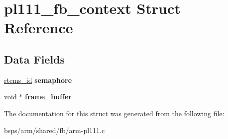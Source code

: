 \hypertarget{structpl111__fb__context}{}\section{pl111\+\_\+fb\+\_\+context Struct Reference}
\label{structpl111__fb__context}
\subsection*{Data Fields}
\begin{DoxyCompactItemize}
\item 
\mbox{\label{structpl111__fb__context_a902c6d780ec77386ff126073ecb726b5}} 
\mbox{\hyperlink{group__ClassicTasks_gab20892b814dced7dd4e5b9bf42becd57}{rtems\+\_\+id}} {\bfseries semaphore}
\item 
\mbox{\label{structpl111__fb__context_a7434e84606e0c2dfe4a14f75d0c0cdef}} 
void $\ast$ {\bfseries frame\+\_\+buffer}
\end{DoxyCompactItemize}


The documentation for this struct was generated from the following file\+:\begin{DoxyCompactItemize}
\item 
bsps/arm/shared/fb/arm-\/pl111.\+c\end{DoxyCompactItemize}
